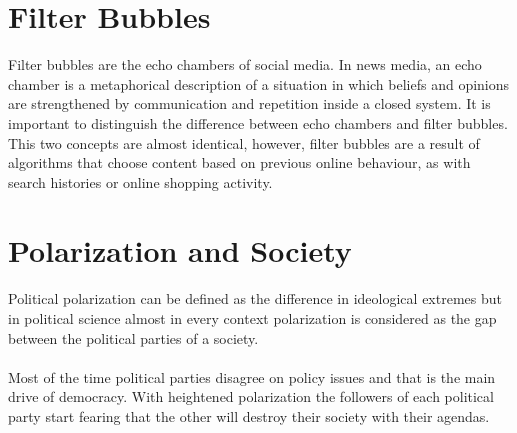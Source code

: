 \section{Filter Bubbles}

Filter bubbles are the echo chambers of social media. In news media, an echo chamber is a metaphorical description of a situation in which beliefs  and opinions are strengthened by communication and repetition inside a closed system. It is important to distinguish the difference between echo chambers and filter bubbles. This two concepts are almost identical, however,  filter bubbles are a result of algorithms that choose content based on previous online behaviour, as with search histories or online shopping activity.


\section{Polarization and Society}

Political polarization can be defined as the difference in ideological extremes but in political science almost in every context polarization is considered as the gap between the political parties of a society.
\\
\\
Most of the time political parties disagree on policy issues and that is the main drive of democracy. With heightened polarization the followers of each political party start fearing that the other will destroy their society with their agendas.
 
\clearpage

